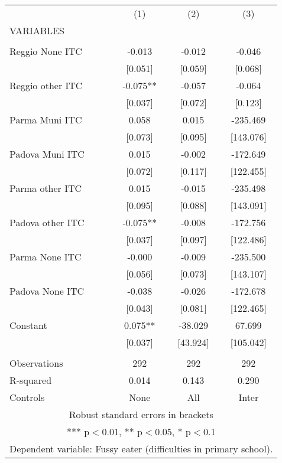 \begin{tabular}{lccc} \hline
 & (1) & (2) & (3) \\
VARIABLES &  &  &  \\ \hline
 &  &  &  \\
Reggio None ITC & -0.013 & -0.012 & -0.046 \\
 & [0.051] & [0.059] & [0.068] \\
Reggio other ITC & -0.075** & -0.057 & -0.064 \\
 & [0.037] & [0.072] & [0.123] \\
Parma Muni ITC & 0.058 & 0.015 & -235.469 \\
 & [0.073] & [0.095] & [143.076] \\
Padova Muni ITC & 0.015 & -0.002 & -172.649 \\
 & [0.072] & [0.117] & [122.455] \\
Parma other ITC & 0.015 & -0.015 & -235.498 \\
 & [0.095] & [0.088] & [143.091] \\
Padova other ITC & -0.075** & -0.008 & -172.756 \\
 & [0.037] & [0.097] & [122.486] \\
Parma None ITC & -0.000 & -0.009 & -235.500 \\
 & [0.056] & [0.073] & [143.107] \\
Padova None ITC & -0.038 & -0.026 & -172.678 \\
 & [0.043] & [0.081] & [122.465] \\
Constant & 0.075** & -38.029 & 67.699 \\
 & [0.037] & [43.924] & [105.042] \\
 &  &  &  \\
Observations & 292 & 292 & 292 \\
R-squared & 0.014 & 0.143 & 0.290 \\
 Controls & None & All & Inter \\ \hline
\multicolumn{4}{c}{ Robust standard errors in brackets} \\
\multicolumn{4}{c}{ *** p$<$0.01, ** p$<$0.05, * p$<$0.1} \\
\multicolumn{4}{c}{ Dependent variable: Fussy eater (difficulties in primary school).} \\
\end{tabular}
